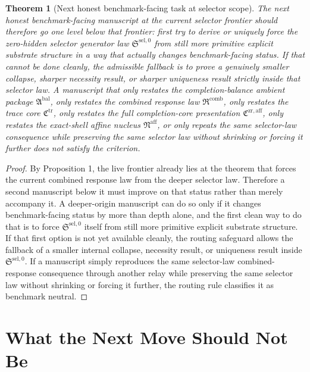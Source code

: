 \documentclass[11pt]{article}
\newcommand{\CompletionCore}{\mathfrak C^{\mathrm{zr,aff}}}
\newcommand{\TraceCore}{\mathfrak C^{\mathrm{tr}}}
\newcommand{\AffineNucleus}{\mathfrak N^{\mathrm{aff}}}
\newcommand{\AmbientPackage}{\mathfrak A^{\mathrm{bal}}}
\newcommand{\CombinedLaw}{\mathfrak R^{\mathrm{comb}}}
\newcommand{\SelectorLaw}{\mathfrak S^{\mathrm{sel},0}}
\newtheorem{theorem}{Theorem}
\begin{document}
\begin{theorem}[Next honest benchmark-facing task at selector scope]
The next honest benchmark-facing manuscript at the current selector frontier should therefore go one level below that frontier: first try to derive or uniquely force the zero-hidden selector generator law \(\SelectorLaw\) from still more primitive explicit substrate structure in a way that actually changes benchmark-facing status. If that cannot be done cleanly, the admissible fallback is to prove a genuinely smaller collapse, sharper necessity result, or sharper uniqueness result strictly inside that selector law. A manuscript that only restates the completion-balance ambient package \(\AmbientPackage\), only restates the combined response law \(\CombinedLaw\), only restates the trace core \(\TraceCore\), only restates the full completion-core presentation \(\CompletionCore\), only restates the exact-shell affine nucleus \(\AffineNucleus\), or only repeats the same selector-law consequence while preserving the same selector law without shrinking or forcing it further does not satisfy the criterion.
\end{theorem}

\begin{proof}
By Proposition 1, the live frontier already lies at the theorem that forces the current combined response law from the deeper selector law. Therefore a second manuscript below it must improve on that status rather than merely accompany it. A deeper-origin manuscript can do so only if it changes benchmark-facing status by more than depth alone, and the first clean way to do that is to force \(\SelectorLaw\) itself from still more primitive explicit substrate structure. If that first option is not yet available cleanly, the routing safeguard allows the fallback of a smaller internal collapse, necessity result, or uniqueness result inside \(\SelectorLaw\). If a manuscript simply reproduces the same selector-law combined-response consequence through another relay while preserving the same selector law without shrinking or forcing it further, the routing rule classifies it as benchmark neutral.
\end{proof}

\section{What the Next Move Should Not Be}
\end{document}
